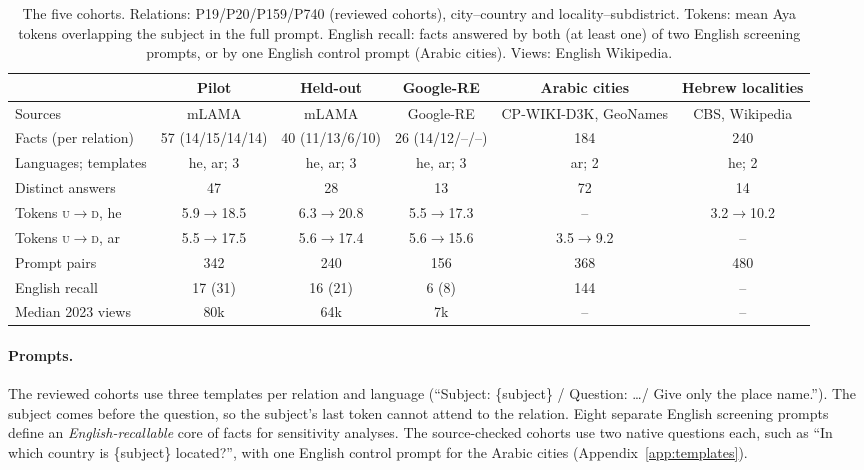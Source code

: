 \documentclass[11pt]{article}
\newcommand{\U}{\textsc{u}}
\newcommand{\D}{\textsc{d}}
\begin{document}
\begin{table}[t]
\centering\footnotesize
\setlength{\tabcolsep}{4.4pt}
\renewcommand{\arraystretch}{1.02}
\begin{tabular}{@{}lccccc@{}}
\toprule
 & Pilot & Held-out & Google-RE & Arabic cities & Hebrew localities\\
\midrule
Sources & mLAMA & mLAMA & Google-RE & CP-WIKI-D3K, GeoNames & CBS, Wikipedia\\
Facts (per relation) & 57 (14/15/14/14) & 40 (11/13/6/10) & 26 (14/12/--/--) & 184 & 240\\
Languages; templates & he, ar; 3 & he, ar; 3 & he, ar; 3 & ar; 2 & he; 2\\
Distinct answers & 47 & 28 & 13 & 72 & 14\\
Tokens \U$\to$\D, he & 5.9$\to$18.5 & 6.3$\to$20.8 & 5.5$\to$17.3 & -- & 3.2$\to$10.2\\
Tokens \U$\to$\D, ar & 5.5$\to$17.5 & 5.6$\to$17.4 & 5.6$\to$15.6 & 3.5$\to$9.2 & --\\
Prompt pairs & 342 & 240 & 156 & 368 & 480\\
English recall & 17 (31) & 16 (21) & 6 (8) & 144 & --\\
Median 2023 views & 80k & 64k & 7k & -- & --\\
\bottomrule
\end{tabular}
\caption{The five cohorts. Relations: P19/P20/P159/P740 (reviewed cohorts),
city--country and locality--subdistrict. Tokens: mean Aya tokens overlapping the
subject in the full prompt. English recall: facts answered by both (at least one) of two English screening
prompts, or by one English control prompt (Arabic cities). Views: English
Wikipedia.}
\label{tab:data}
\end{table}

\paragraph{Prompts.}
The reviewed cohorts use three templates per relation and language (``Subject:
\{subject\} / Question: \dots / Give only the place name.''). The subject comes
before the question, so the subject's last token cannot attend to the relation. Eight separate English screening prompts define an
\emph{English-recallable} core of facts for
sensitivity analyses. The source-checked cohorts use two native questions each,
such as ``In which country is \{subject\} located?'', with one English control prompt for the Arabic cities
(Appendix~\ref{app:templates}).
\end{document}
